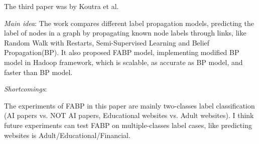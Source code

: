 The third paper was by Koutra et al.
\cite{Daubechies92Ten}
\begin{itemize*}
\item {\em Main idea}: The work compares different label propagation models, predicting the label of nodes in a graph by propagating known node labels through links, like Random Walk with Restarts, Semi-Supervised Learning and Belief Propagation(BP). It also proposed FABP model, implementing modified BP model in Hadoop framework, which is scalable, as accurate as BP model, and faster than BP model.
\item {\em Shortcomings}:
		\begin{itemize*}
		\item
			The experiments of FABP in this paper are mainly two-classes label classification (AI papers vs. NOT AI papers, Educational websites vs. Adult websites). I think future experiments can test FABP on multiple-classes label cases, like predicting websites is Adult/Educational/Financial.
		\end{itemize*}
\end{itemize*}